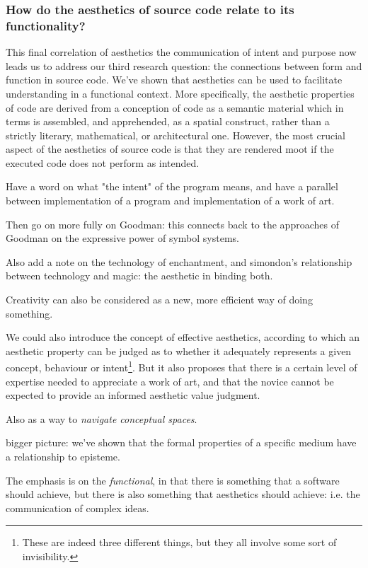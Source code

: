 \subsubsection{How do the aesthetics of source code relate to its functionality?} %

This final correlation of aesthetics the communication of intent and purpose now leads us to address our third research question: the connections between form and function in source code. We've shown that aesthetics can be used to facilitate understanding in a functional context. More specifically, the aesthetic properties of code are derived from a conception of code as a semantic material which in terms is assembled, and apprehended, as a spatial construct, rather than a strictly literary, mathematical, or architectural one. However, the most crucial aspect of the aesthetics of source code is that they are rendered moot if the executed code does not perform as intended.

Have a word on what "the intent" of the program means, and have a parallel between implementation of a program and implementation of a work of art.

Then go on more fully on Goodman: this connects back to the approaches of Goodman on the expressive power of symbol systems.

Also add a note on the technology of enchantment, and simondon's relationship between technology and magic: the aesthetic in binding both.

Creativity can also be considered as a new, more efficient way of doing something.

We could also introduce the concept of effective aesthetics, according to which an aesthetic property can be judged as to whether it adequately represents a given concept, behaviour or intent\footnote{These are indeed three different things, but they all involve some sort of invisibility.}. But it also proposes that there is a certain level of expertise needed to appreciate a work of art, and that the novice cannot be expected to provide an informed aesthetic value judgment.

Also as a way to \emph{navigate conceptual spaces}.

bigger picture: we've shown that the formal properties of a specific medium have a relationship to episteme.

The emphasis is on the \emph{functional}, in that there is something that a software should achieve, but there is also something that aesthetics should achieve: i.e. the communication of complex ideas.

